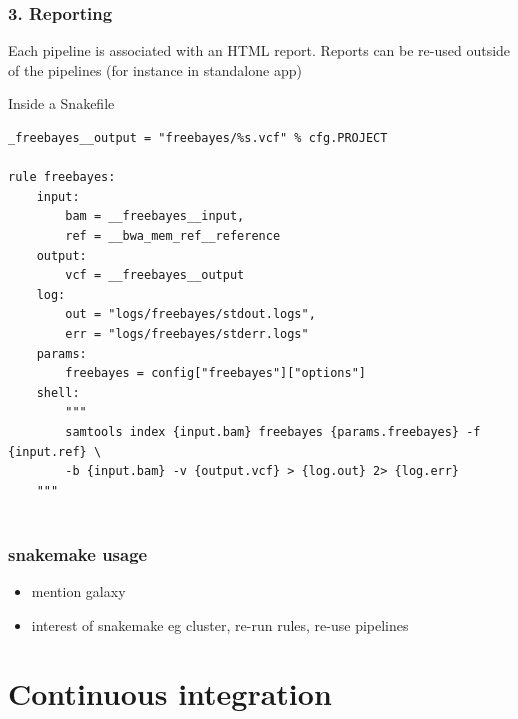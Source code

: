 \documentclass{beamer}
\begin{document}
\begin{frame}[fragile]
    \frametitle{3. Reporting}
    Each pipeline is associated with an HTML report. Reports can be re-used 
    outside of the pipelines (for instance in standalone app)
    \begin{block}{Inside a Snakefile}
    \begin{lstlisting}
_freebayes__output = "freebayes/%s.vcf" % cfg.PROJECT

rule freebayes:
    input:
        bam = __freebayes__input,
        ref = __bwa_mem_ref__reference
    output:
        vcf = __freebayes__output
    log:
        out = "logs/freebayes/stdout.logs",
        err = "logs/freebayes/stderr.logs"
    params:
        freebayes = config["freebayes"]["options"]
    shell:
        """
        samtools index {input.bam} freebayes {params.freebayes} -f {input.ref} \
        -b {input.bam} -v {output.vcf} > {log.out} 2> {log.err}
    """
   
    \end{lstlisting}
    \end{block} 
\end{frame}





\begin{frame}
 \frametitle{snakemake usage }
 \tiny
 \begin{block}{}
  \begin{itemize}
   \item mention galaxy
   \item interest of snakemake eg cluster, re-run rules, re-use pipelines
   \end{itemize}
 \end{block} 
\end{frame}




\section{Continuous integration}
\end{document}
